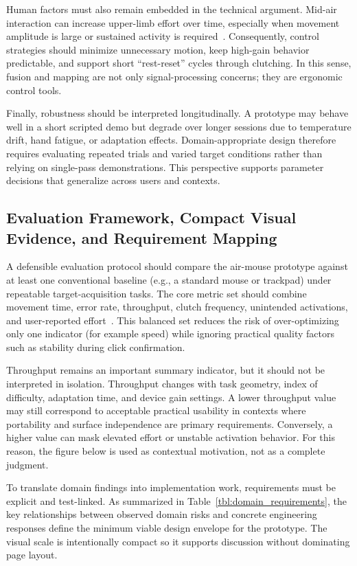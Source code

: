 Human factors must also remain embedded in the technical argument. Mid-air interaction can increase upper-limb effort over time, especially when movement amplitude is large or sustained activity is required~\cite{purdue2017gorillaarm}. Consequently, control strategies should minimize unnecessary motion, keep high-gain behavior predictable, and support short ``rest-reset'' cycles through clutching. In this sense, fusion and mapping are not only signal-processing concerns; they are ergonomic control tools.

Finally, robustness should be interpreted longitudinally. A prototype may behave well in a short scripted demo but degrade over longer sessions due to temperature drift, hand fatigue, or adaptation effects. Domain-appropriate design therefore requires evaluating repeated trials and varied target conditions rather than relying on single-pass demonstrations. This perspective supports parameter decisions that generalize across users and contexts.

\subsection{Evaluation Framework, Compact Visual Evidence, and Requirement Mapping}

A defensible evaluation protocol should compare the air-mouse prototype against at least one conventional baseline (e.g., a standard mouse or trackpad) under repeatable target-acquisition tasks. The core metric set should combine movement time, error rate, throughput, clutch frequency, unintended activations, and user-reported effort~\cite{soukoreff2004towards}. This balanced set reduces the risk of over-optimizing only one indicator (for example speed) while ignoring practical quality factors such as stability during click confirmation.

Throughput remains an important summary indicator, but it should not be interpreted in isolation. Throughput changes with task geometry, index of difficulty, adaptation time, and device gain settings. A lower throughput value may still correspond to acceptable practical usability in contexts where portability and surface independence are primary requirements. Conversely, a higher value can mask elevated effort or unstable activation behavior. For this reason, the figure below is used as contextual motivation, not as a complete judgment.



To translate domain findings into implementation work, requirements must be explicit and test-linked. As summarized in Table~\ref{tbl:domain_requirements}, the key relationships between observed domain risks and concrete engineering responses define the minimum viable design envelope for the prototype. The visual scale is intentionally compact so it supports discussion without dominating page layout.

